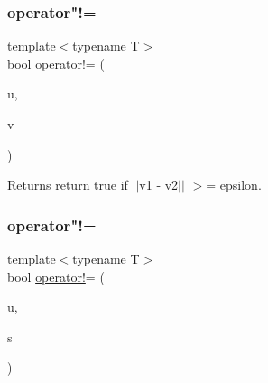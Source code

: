 \subsubsection{\texorpdfstring{operator"!=}{operator!=}\hspace{0.1cm}{\footnotesize\ttfamily [1/3]}}
{\footnotesize\ttfamily template$<$typename T$>$ \\
bool \mbox{\hyperlink{class_n_vector_a697b7e9e059d8045dc5f682f94521548}{operator!}}= (\begin{DoxyParamCaption}\item[{const \mbox{\hyperlink{class_n_vector}{N\+Vector}}$<$ T $>$ \&}]{u,  }\item[{const \mbox{\hyperlink{class_n_vector}{N\+Vector}}$<$ T $>$ \&}]{v }\end{DoxyParamCaption})\hspace{0.3cm}{\ttfamily [friend]}}

\begin{DoxyReturn}{Returns}
return true if $\vert$$\vert$v1 -\/ v2$\vert$$\vert$ $>$= epsilon. 
\end{DoxyReturn}
\mbox{\label{class_n_vector_a5f6935537ff657c5c48c14090322e851}} 
\subsubsection{\texorpdfstring{operator"!=}{operator!=}\hspace{0.1cm}{\footnotesize\ttfamily [2/3]}}
{\footnotesize\ttfamily template$<$typename T$>$ \\
bool \mbox{\hyperlink{class_n_vector_a697b7e9e059d8045dc5f682f94521548}{operator!}}= (\begin{DoxyParamCaption}\item[{const \mbox{\hyperlink{class_n_vector}{N\+Vector}}$<$ T $>$ \&}]{u,  }\item[{T}]{s }\end{DoxyParamCaption})\hspace{0.3cm}{\ttfamily [friend]}}

\mbox{\label{class_n_vector_ad51fab9cb11a2faf828455d676ee6755}} 
